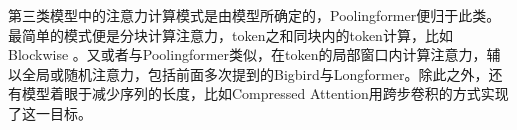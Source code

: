 第三类模型中的注意力计算模式是由模型所确定的，Poolingformer便归于此类。最简单的模式便是分块计算注意力，token之和同块内的token计算，比如Blockwise\cite{qiu2019blockwise} 。又或者与Poolingformer类似，在token的局部窗口内计算注意力，辅以全局或随机注意力，包括前面多次提到的Bigbird\cite{zaheer2020big}与Longformer\cite{beltagy2020longformer}。除此之外，还有模型着眼于减少序列的长度，比如Compressed Attention\cite{liu2018generating}用跨步卷积的方式实现了这一目标。\textcolor{white}{\cite{zhang2021poolingformer}}